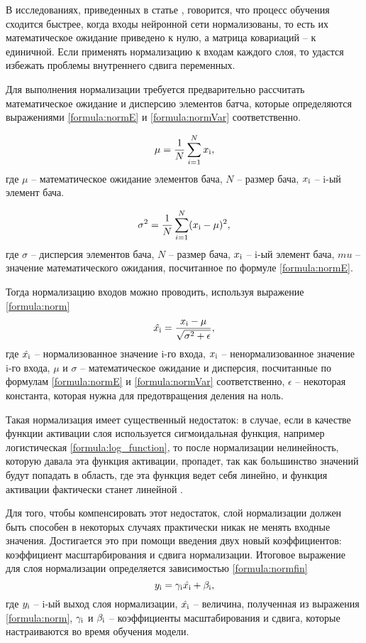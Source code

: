 В исследованиях, приведенных в статье \cite{normalisation_lecun}, говорится, что процесс обучения сходится быстрее, когда входы нейронной сети нормализованы, то есть их математическое ожидание приведено к нулю, а матрица ковариаций -- к единичной. Если применять нормализацию к входам каждого слоя, то удастся избежать проблемы внутреннего сдвига переменных.

Для выполнения нормализации требуется предварительно рассчитать математическое ожидание и дисперсию элементов батча, которые определяются выражениями \ref{formula:normE} и \ref{formula:normVar} соответственно.

\begin{equation}\label{formula:normE}
\mu = \frac{1}{N} \sum\limits_{i=1}^{N}x_{\rm{i}},
\end{equation}
где $\mu$ -- математическое ожидание элементов бача, $N$ -- размер бача, $x_{\rm{i}}$ -- i-ый элемент бача.

\begin{equation}\label{formula:normVar}
\sigma^2 = \frac{1}{N} \sum\limits_{i=1}^{N}(x_{\rm{i}} - \mu)^2,
\end{equation}
где $\sigma$ -- дисперсия элементов бача, $N$ -- размер бача, $x_{\rm{i}}$ -- i-ый элемент бача, $mu$ -- значение математического ожидания, посчитанное по формуле \ref{formula:normE}.

Тогда нормализацию входов можно проводить, используя выражение \ref{formula:norm}
\begin{equation}\label{formula:norm}
\hat{x_{\rm{i}}} = \frac{x_{\rm{i}} - \mu}{\sqrt{\sigma^2 + \epsilon}},
\end{equation}
где $\hat{x_{\rm{i}}}$ -- нормализованное значение i-го входа, $x_{\rm{i}}$ -- ненормализованное значение i-го входа, $\mu$ и $\sigma$ -- математическое ожидание и дисперсия, посчитанные по формулам \ref{formula:normE} и \ref{formula:normVar} соответственно, $\epsilon$ -- некоторая константа, которая нужна для предотвращения деления на ноль.

Такая нормализация имеет существенный недостаток: в случае, если в качестве функции активации слоя используется сигмоидальная функция, например логистическая \ref{formula:log_function}, то после нормализации нелинейность, которую давала эта функция активации, пропадет, так как большинство значений будут попадать в область, где эта функция ведет себя линейно, и функция активации фактически станет линейной \cite{normalisation}.

Для того, чтобы компенсировать этот недостаток, слой нормализации должен быть способен в некоторых случаях практически никак не менять входные значения. Достигается это при помощи введения двух новый коэффициентов: коэффициент масштарбирования и сдвига нормализации. Итоговое выражение для слоя нормализации определяется зависимостью \ref{formula:normfin}
\begin{equation}\label{formula:normfin}
y_{\rm{i}} = \gamma_{\rm{i}}\hat{x_{\rm{i}}} + \beta_{\rm{i}},
\end{equation}
где $y_{\rm{i}}$ -- i-ый выход слоя нормализации, $\hat{x_{\rm{i}}}$ -- величина, полученная из выражения \ref{formula:norm}, $\gamma_{\rm{i}}$ и $\beta_{\rm{i}}$ -- коэффициенты масштабирования и сдвига, которые настраиваются во время обучения модели.

